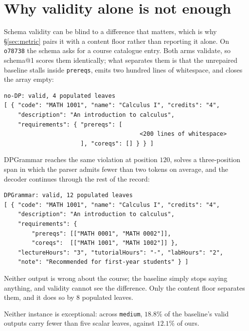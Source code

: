 \section{Why validity alone is not enough}
\label{app:example}

Schema validity can be blind to a difference that matters, which is why
\S\ref{sec:metric} pairs it with a content floor rather than reporting it alone.
On \texttt{o78738} the schema asks for a course catalogue entry. Both arms
validate, so schema@1 scores them identically; what separates them is that the
unrepaired baseline stalls inside \texttt{prereqs}, emits two hundred lines of
whitespace, and closes the array empty:

\begin{center}
\footnotesize
\begin{minipage}{0.86\linewidth}
\begin{verbatim}
no-DP: valid, 4 populated leaves
[ { "code": "MATH 1001", "name": "Calculus I", "credits": "4",
    "description": "An introduction to calculus",
    "requirements": { "prereqs": [
                                       <200 lines of whitespace>
                      ], "coreqs": [] } } ]
\end{verbatim}
\end{minipage}
\end{center}

\noindent
DPGrammar reaches the same violation at position $120$, solves a three-position
span in which the parser admits fewer than two tokens on average, and the
decoder continues through the rest of the record:

\begin{center}
\footnotesize
\begin{minipage}{0.86\linewidth}
\begin{verbatim}
DPGrammar: valid, 12 populated leaves
[ { "code": "MATH 1001", "name": "Calculus I", "credits": "4",
    "description": "An introduction to calculus",
    "requirements": {
        "prereqs": [["MATH 0001", "MATH 0002"]],
        "coreqs":  [["MATH 1001", "MATH 1002"]] },
    "lectureHours": "3", "tutorialHours": "-", "labHours": "2",
    "note": "Recommended for first-year students" } ]
\end{verbatim}
\end{minipage}
\end{center}

\noindent
Neither output is wrong about the course; the baseline simply stops saying
anything, and validity cannot see the difference. Only the content floor
separates them, and it does so by $8$ populated leaves.

Neither instance is exceptional: across \texttt{medium}, $18.8\%$ of the
baseline's valid outputs carry fewer than five scalar leaves, against $12.1\%$
of ours.
